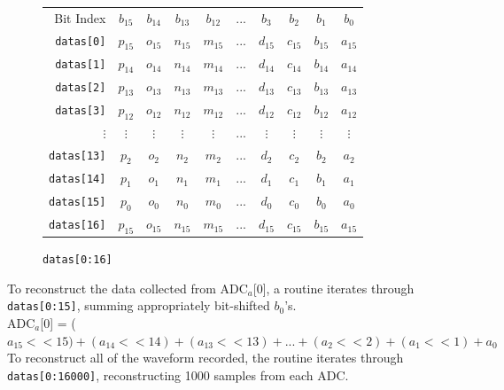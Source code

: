 \begin{figure}[h]
\begin{center}
\begin{tabular}{ r|c c c c c c c c c | }
\multicolumn{1}{r}{Bit Index}
 &  \multicolumn{1}{c}{$b_{15}$}
 &  \multicolumn{1}{c}{$b_{14}$}
 &  \multicolumn{1}{c}{$b_{13}$}
 &  \multicolumn{1}{c}{$b_{12}$}
 &  \multicolumn{1}{c}{$...$}
 &  \multicolumn{1}{c}{$b_{3}$}
 &  \multicolumn{1}{c}{$b_{2}$}
 &  \multicolumn{1}{c}{$b_{1}$}
 &  \multicolumn{1}{c}{$b_{0}$}\\
\cline{2-10}
\texttt{datas[0]} 
 & $p_{15}$ & $o_{15}$ & $n_{15}$ & $m_{15}$ & ... & $d_{15}$ & $c_{15}$ & $b_{15}$ & $a_{15}$
  \\ \cline{2-10} \cline{2-10}
 \texttt{datas[1]} 
 & $p_{14}$ & $o_{14}$ & $n_{14}$ & $m_{14}$ & ... & $d_{14}$ & $c_{14}$ & $b_{14}$ & $a_{14}$
  \\  \cline{2-10} 
 \texttt{datas[2]} 
 & $p_{13}$ & $o_{13}$ & $n_{13}$ & $m_{13}$ & ... & $d_{13}$ & $c_{13}$ & $b_{13}$ & $a_{13}$
  \\  \cline{2-10} 
 \texttt{datas[3]} 
 & $p_{12}$ & $o_{12}$ & $n_{12}$ & $m_{12}$ & ... & $d_{12}$ & $c_{12}$ & $b_{12}$ & $a_{12}$
  \\  \cline{2-10} 
$\vdots$\hspace{2em}
 & $\vdots$ & $\vdots$ & $\vdots$ & $\vdots$ & ... & $\vdots$ & $\vdots$ & $\vdots$ & $\vdots$
  \\  \cline{2-10} 
 \texttt{datas[13]}
 & $p_{2}$ & $o_{2}$ & $n_{2}$ & $m_{2}$ & ... & $d_{2}$ & $c_{2}$ & $b_{2}$ & $a_{2}$
  \\  \cline{2-10} 
 \texttt{datas[14]}
 & $p_{1}$ & $o_{1}$ & $n_{1}$ & $m_{1}$ & ... & $d_{1}$ & $c_{1}$ & $b_{1}$ & $a_{1}$
  \\  \cline{2-10} 
 \texttt{datas[15]}
 & $p_{0}$ & $o_{0}$ & $n_{0}$ & $m_{0}$ & ... & $d_{0}$ & $c_{0}$ & $b_{0}$ & $a_{0}$
  \\  \cline{2-10} 
 \texttt{datas[16]}
 & $p_{15}$ & $o_{15}$ & $n_{15}$ & $m_{15}$ & ... & $d_{15}$ & $c_{15}$ & $b_{15}$ & $a_{15}$
  \\  \cline{2-10} 
  
\end{tabular}
\end{center}
\caption{\texttt{datas[0:16]}}
\label{fig:data-reconstruct}
\end{figure}

To reconstruct the data collected from ADC$_a$[0], a routine iterates through \texttt{datas[0:15]}, summing appropriately bit-shifted $b_0$'s.\\
ADC$_a$[0] = ($a_{15}<<15)+(a_{14}<<14)+(a_{13}<<13)+...+(a_{2}<<2)+(a_{1}<<1)+a_0$\\
To reconstruct all of the waveform recorded, the routine iterates through \texttt{datas[0:16000]}, reconstructing 1000 samples from each ADC.

